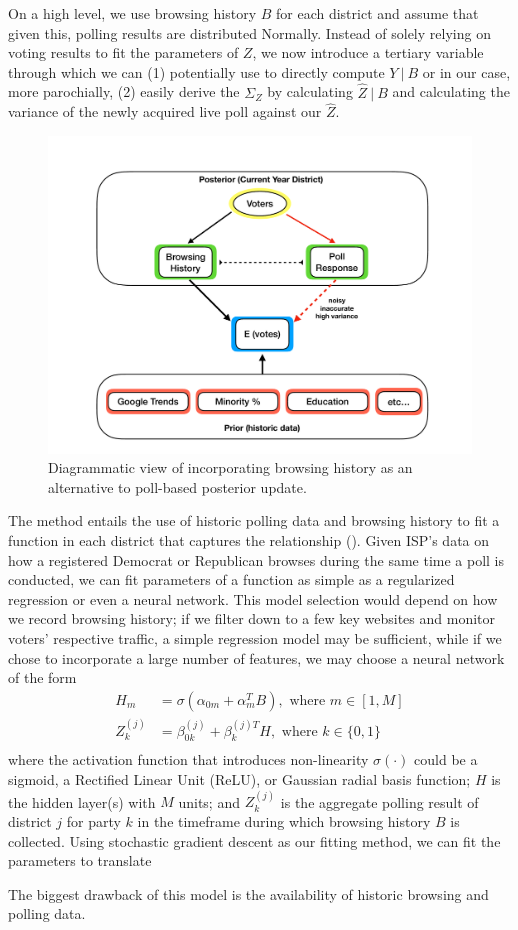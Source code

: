 \documentclass[12pt, letterpaper]{article}
\begin{document}
On a high level, we use browsing history $B$ for each district and assume that given this, polling results are distributed Normally. Instead of solely relying on voting results to fit the parameters of $Z$, we now introduce a tertiary variable through which we can (1) potentially use to directly compute $Y \ | \ B$ or in our case, more parochially, (2) easily derive the $\Sigma_Z$ by calculating $\hat{Z} \ | \ B$ and calculating the variance of the newly acquired live poll against our $\hat{Z}$.

\begin{figure}[tbh]
  \centering
  \includegraphics[scale=0.4]{browsing_diagram.pdf}
  \caption{Diagrammatic view of incorporating browsing history as an alternative to poll-based posterior update.}
  \label{fig:browsing}
\end{figure}

The method entails the use of historic polling data and browsing history to fit a function in each district that captures the relationship (). Given ISP's data on how a registered Democrat or Republican browses during the same time a poll is conducted, we can fit parameters of a function as simple as a regularized regression or even a neural network. This model selection would depend on how we record browsing history; if we filter down to a few key websites and monitor voters' respective traffic, a simple regression model may be sufficient, while if we chose to incorporate a large number of features, we may choose a neural network of the form
\begin{align*}
H_m &= \sigma(\alpha_{0m} + \alpha_m^TB), \text{\ where \ } m \in [1,M]\\
Z_{k}^{(j)} &= \beta_{0k}^{(j)} + \beta_k^{(j)T}H, \text{\ where \ } k \in \{0, 1\}\\
\end{align*}
where the activation function that introduces non-linearity $\sigma(\cdot)$ could be a sigmoid, a Rectified Linear Unit (ReLU), or Gaussian radial basis function; $H$ is the hidden layer(s) with $M$ units; and $Z_k^{(j)}$ is the aggregate polling result of district $j$ for party $k$ in the timeframe during which browsing history $B$ is collected. Using stochastic gradient descent as our fitting method, we can fit the parameters to translate 

The biggest drawback of this model is the availability of historic browsing and polling data.



\end{document}
